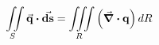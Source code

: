 \begin{equation}
  \iint\limits_S \va{q}\vdot\va{ds} = \iiint\limits_R \left( \div{\vb{q}} \right) dR
\end{equation}

